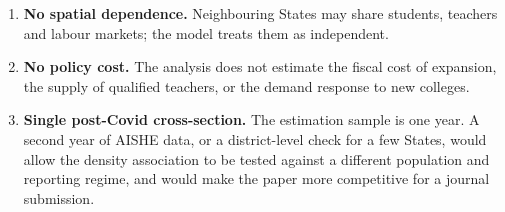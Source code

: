 \begin{enumerate}
  \item \textbf{No spatial dependence.} Neighbouring States may share students, teachers and labour markets; the model treats them as independent.
  \item \textbf{No policy cost.} The analysis does not estimate the fiscal cost of expansion, the supply of qualified teachers, or the demand response to new colleges.
  \item \textbf{Single post-Covid cross-section.} The estimation sample is one year. A second year of AISHE data, or a district-level check for a few States, would allow the density association to be tested against a different population and reporting regime, and would make the paper more competitive for a journal submission.
\end{enumerate}
